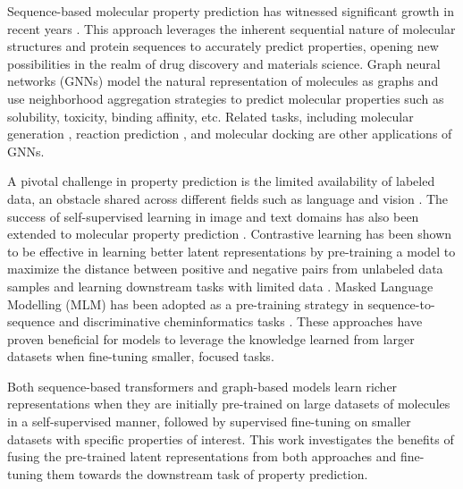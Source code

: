 \documentclass[sigconf,nonacm]{acmart}
\begin{document}
Sequence-based molecular property prediction has witnessed significant growth in recent years \cite{10.1145/3307339.3342186,mgbert,DBLP:journals/corr/abs-2010-09885}. This approach leverages the inherent sequential nature of molecular structures and protein sequences to accurately predict properties, opening new possibilities in the realm of drug discovery and materials science. Graph neural networks (GNNs) model the natural representation of molecules as graphs and use neighborhood aggregation strategies to predict molecular properties such as solubility, toxicity, binding affinity, etc. \cite{pmlr-v70-gilmer17a,doi:10.1021/acs.jcim.9b00237} Related tasks, including molecular generation \cite{decao2022molgan}, reaction prediction \cite{mao2020molecular}, and molecular docking \cite{docking} are other applications of GNNs.







A pivotal challenge in property prediction is the limited availability of labeled data, an obstacle shared across different fields such as language and vision \cite{DBLP:conf/iccv/DoerschGE15,DBLP:conf/iclr/GidarisSK18}.
The success of self-supervised learning in image and text domains \cite{NEURIPS2020_f3ada80d,DBLP:conf/naacl/DevlinCLT19} has also been extended to molecular property prediction \cite{article22}. Contrastive learning \cite{pmlr-v119-chen20j} has been shown to be effective in learning better latent representations by pre-training a model to maximize the distance between positive and negative pairs from unlabeled data samples and learning downstream tasks with limited data \cite{NEURIPS2020_94aef384,DBLP:conf/iclr/HuLGZLPL20}. Masked Language Modelling (MLM) \cite{DBLP:conf/naacl/DevlinCLT19, lewis2020bart} has been adopted as a pre-training strategy in sequence-to-sequence and discriminative cheminformatics tasks \cite{Irwin_2022}. These approaches have proven beneficial for models to leverage the knowledge learned from larger datasets when fine-tuning smaller, focused tasks.


Both sequence-based transformers and graph-based models learn richer representations when they are initially pre-trained on large datasets of molecules in a self-supervised manner, followed by supervised fine-tuning on smaller datasets with specific properties of interest. This work investigates the benefits of fusing the pre-trained latent representations from both approaches and fine-tuning them towards the downstream task of property prediction.
\end{document}
